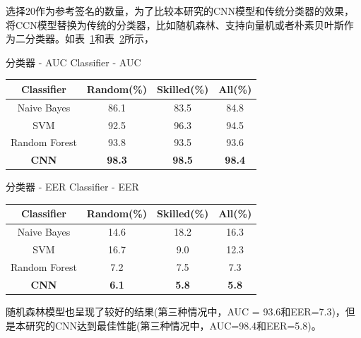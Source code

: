 选择20作为参考签名的数量，为了比较本研究的CNN模型和传统分类器的效果，将CCN模型替换为传统的分类器，比如随机森林、支持向量机或者朴素贝叶斯作为二分类器。如表~\ref{table:classifier-auc}和表~\ref{table:classifier-eer}所示，
\begin{table}[ht]
  \centering
  \bicaption
  {分类器 - AUC}
  {Classifier - AUC} 
  \label{table:classifier-auc} 
  \begin{tabular}{c c c c} 
      \hline\hline 
      Classifier & Random(\%) & Skilled(\%) & All(\%) \\ 
      \hline 
      Naive Bayes & 86.1 & 83.5 & 84.8 \\
      SVM & 92.5 & 96.3 & 94.5 \\
      Random Forest & 93.8 & 93.5 & 93.6 \\
       \textbf{CNN} &  \textbf{98.3} &  \textbf{98.5} &  \textbf{98.4} \\
      \hline 
  \end{tabular}
\end{table}
\begin{table}[ht]
  \centering
    \bicaption
    {分类器 - EER}
    {Classifier - EER}
    \label{table:classifier-eer}
    \begin{tabular}{c c c c}
      \hline\hline 
      Classifier & Random(\%) & Skilled(\%) & All(\%) \\ 
      \hline 
      Naive Bayes & 14.6 & 18.2 & 16.3 \\
      SVM & 16.7 & 9.0 & 12.3 \\
      Random Forest & 7.2 & 7.5 & 7.3 \\
       \textbf{CNN} &  \textbf{6.1} &  \textbf{5.8} &  \textbf{5.8} \\
      \hline 
    \end{tabular}
\end{table}
随机森林模型也呈现了较好的结果(第三种情况中，AUC = 93.6和EER=7.3)，但是本研究的CNN达到最佳性能(第三种情况中，AUC=98.4和EER=5.8)。

